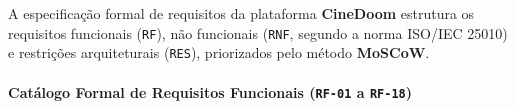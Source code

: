 



A especificação formal de requisitos da plataforma \textbf{CineDoom} estrutura os requisitos funcionais (\texttt{RF}), não funcionais (\texttt{RNF}, segundo a norma ISO/IEC 25010) e restrições arquiteturais (\texttt{RES}), priorizados pelo método \textbf{MoSCoW}.

\paragraph{\texorpdfstring{Catálogo Formal de Requisitos Funcionais (\texttt{RF-01} a \texttt{RF-18})}{Catálogo Formal de Requisitos Funcionais (RF-01 a RF-18)}}

